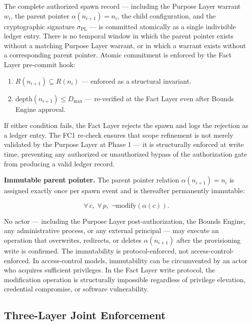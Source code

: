 The complete authorized spawn record — including the Purpose Layer warrant $w_i$, the parent pointer $\alpha(n_{i+1}) = n_i$, the child configuration, and the cryptographic signature $\sigma_{\text{PL}}$ — is committed atomically as a single indivisible ledger entry. There is no temporal window in which the parent pointer exists without a matching Purpose Layer warrant, or in which a warrant exists without a corresponding parent pointer. Atomic commitment is enforced by the Fact Layer pre-commit hook:

\begin{enumerate}
    \item[(FC1)]$R(n_{i+1}) \subseteq R(n_i)$ — enforced as a structural invariant.
    \item[(FC2)]$\text{depth}(n_{i+1}) \leq D_{\max}$ — re-verified at the Fact Layer even after Bounds Engine approval.
\end{enumerate}

If either condition fails, the Fact Layer rejects the spawn and logs the rejection as a ledger entry. The FC1 re-check ensures that scope refinement is not merely validated by the Purpose Layer at Phase 1 — it is structurally enforced at write time, preventing any authorized or unauthorized bypass of the authorization gate from producing a valid ledger record.

\medskip
\noindent\textbf{Immutable parent pointer.} The parent pointer relation $\alpha(n_{i+1}) = n_i$ is assigned exactly once per spawn event and is thereafter permanently immutable:

\begin{equation}
\forall\, c,\; \forall\, p,\; \neg\text{modify}(\alpha(c)).
\label{eq:rs-pointer-immutability}
\end{equation}

No actor — including the Purpose Layer post-authorization, the Bounds Engine, any administrative process, or any external principal — may execute an operation that overwrites, redirects, or deletes $\alpha(n_{i+1})$ after the provisioning write is confirmed. The immutability is protocol-enforced, not access-control-enforced. In access-control models, immutability can be circumvented by an actor who acquires sufficient privileges. In the Fact Layer write protocol, the modification operation is structurally impossible regardless of privilege elevation, credential compromise, or software vulnerability.

\subsection{Three-Layer Joint Enforcement}
\label{sec:rs-three-layer-joint}

